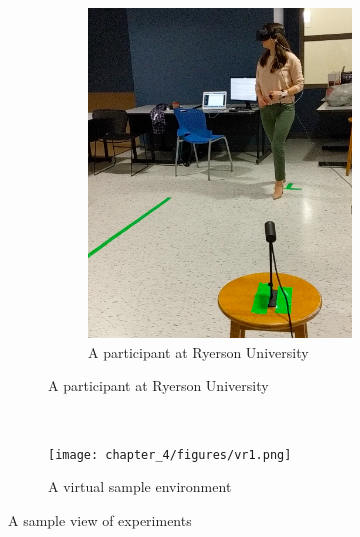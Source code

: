 \begin{figure}[!ht]
\begin{adjustbox}{varwidth=1.1\textwidth,fbox,center}
\begin{subfigure}{0.9\linewidth}
\begin{subfigure}[b]{0.5\textwidth}
         \includegraphics[scale=0.4]{chapter_4/figures/img1.png}
         \caption{A participant at Ryerson University}
     \end{subfigure}
\end{subfigure}\\[2ex]
\begin{subfigure}{0.8\linewidth}

\centering
\texttt{[image: chapter\_4/figures/vr1.png]}
\caption{A virtual sample environment}
\end{subfigure}
\end{adjustbox}

\caption{A sample view of experiments}
\label{fig:vire}
\end{figure}

